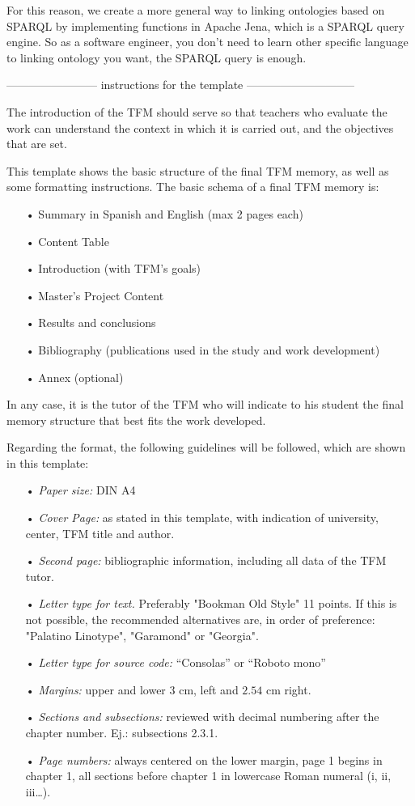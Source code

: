For this reason, we create a more general way to linking ontologies based on SPARQL by implementing functions in Apache Jena, which is a SPARQL query engine. So as a software engineer, you don't need to learn other specific language to linking ontology you want, the SPARQL query is enough.






\newpage


------------------------ instructions for the template -----------------------------


The introduction of the TFM should serve so that teachers who evaluate the work can understand the context in which it is carried out, and the objectives that are set.

This template shows the basic structure of the final TFM memory, as well as some formatting instructions.
The basic schema of a final  TFM memory is:
\begin{itemize}
\item[•] Summary in Spanish and English (max 2 pages each)
\item[•] Content Table
\item[•] Introduction (with TFM's goals)
\item[•] Master’s Project Content
\item[•] Results and conclusions
\item[•] Bibliography (publications used in the study and work development)
\item[•] Annex (optional)
\end{itemize}


In any case, it is the tutor of the TFM who will indicate to his student the final memory structure that best fits the work developed.

Regarding the format, the following guidelines will be followed, which are shown in this template:
\begin{itemize}
\item[•] \textit{Paper size:} DIN A4
\item[•] \textit{Cover Page:} as stated in this template, with indication of university, center, TFM title and author.
\item[•] \textit{Second page:} bibliographic information, including all data of the TFM tutor.
\item[•] \textit{Letter type for text.} Preferably "Bookman Old Style" 11 points. If this is not possible, the recommended alternatives are, in order of preference: "Palatino Linotype", "Garamond" or "Georgia".
\item[•] \textit{Letter type for source code:} “Consolas” or “Roboto mono”
\item[•] \textit{Margins:} upper and lower $3$ cm, left and $2.54$ cm right.
\item[•] \textit{Sections and subsections:} reviewed with decimal numbering after the chapter number. Ej.: subsections 2.3.1.
\item[•] \textit{Page numbers:} always centered on the lower margin, page 1 begins in chapter 1, all sections before chapter 1 in lowercase Roman numeral (i, ii, iii…).
\end{itemize}

